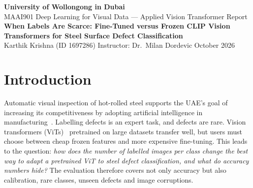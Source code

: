 \documentclass[11pt,a4paper]{article}
\begin{document}
\begin{center}
{\large\bfseries University of Wollongong in Dubai}\\[2pt]
MAAI901 Deep Learning for Visual Data --- Applied Vision Transformer Report\\[8pt]
{\Large\bfseries When Labels Are Scarce: Fine-Tuned versus Frozen CLIP Vision Transformers for Steel Surface Defect Classification}\\[8pt]
Karthik Krishna (ID 1697286) \quad Instructor: Dr.\ Milan Dordevic  October 2026
\end{center}

\begin{abstract}
\noindent Steel plants rarely have large labelled defect archives. This report asks how many labelled images per class a vision transformer needs, and whether full fine-tuning is worth its cost over a frozen encoder with a linear classifier. On the NEU surface defect dataset (six classes, 1,800 images), frozen CLIP ViT-B/16 features, partial and full fine-tuning, an ImageNet-21k ViT-B/16 and zero-shot CLIP are compared, using 5-fold cross-validation, 1 to 240 labels per class, calibration, rare-defect, unseen-defect and corruption tests. Full fine-tuning of CLIP reaches 95\% accuracy with 3 labels per class (tuned frozen features: 10) and leads a tuned frozen baseline by 12.7 points at 1 label, but the gap vanishes beyond about 50 labels. Fine-tuned models are well calibrated yet still make confident mistakes, and zero-shot CLIP performs at chance. Because the dataset saturates easily, the claims are limited accordingly.
\end{abstract}

\section{Introduction}
Automatic visual inspection of hot-rolled steel supports the UAE's goal of increasing its competitiveness by adopting artificial intelligence in manufacturing~\cite{uaeai}. Labelling defects is an expert task, and defects are rare. Vision transformers (ViTs)~\cite{vit} pretrained on large datasets transfer well, but users must choose between cheap frozen features and more expensive fine-tuning. This leads to the question: \emph{how does the number of labelled images per class change the best way to adapt a pretrained ViT to steel defect classification, and what do accuracy numbers hide?} The evaluation therefore covers not only accuracy but also calibration, rare classes, unseen defects and image corruptions.
\end{document}
